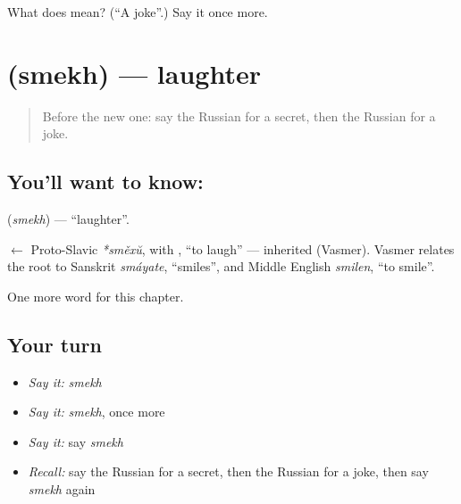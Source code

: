 \begin{tcolorbox}[breakable,colback=teal!4,colframe=teal!35!black,title={Before you move on}]
What does  mean? (\textquotedblleft{}A joke\textquotedblright{}.) Say it once more.
\end{tcolorbox}
\section[\texorpdfstring{\ru{смех} (smekh)}{смех (smekh)}]{ (smekh) — laughter}

\label{lesson:RU-C200-smekh}



\begin{quote}
Before the new one: say the Russian for a secret, then the Russian for a joke.
\end{quote}

\subsection*{You'll want to know: }
\textbf{} (\emph{smekh}) — \textquotedblleft{}laughter\textquotedblright{}.

\begin{cousinweb}
\textbf{} $\leftarrow$ Proto-Slavic \emph{*směxŭ}, with \emph{}, \textquotedblleft{}to laugh\textquotedblright{} — inherited (Vasmer). Vasmer relates the root to Sanskrit \emph{smáyate}, \textquotedblleft{}smiles\textquotedblright{}, and Middle English \emph{smilen}, \textquotedblleft{}to smile\textquotedblright{}.
\end{cousinweb}

\begin{grammarlens}[title={What you've built}]
One more word for this chapter.
\end{grammarlens}

\subsection*{Your turn}
\begin{itemize}
\raggedright
  \item \emph{Say it:} \emph{smekh}
  \item \emph{Say it:} \emph{smekh}, once more
  \item \emph{Say it:} say \emph{smekh}
  \item \emph{Recall:} say the Russian for a secret, then the Russian for a joke, then say \emph{smekh} again
\end{itemize}


